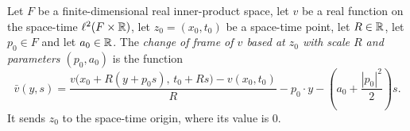 \begin{definition}
Let $F$ be a finite-dimensional real inner-product space, let $v$ be a real
function on the space-time $\ell^2(F\times\mathbb{R})$, let $z_0=(x_0,t_0)$ be a
space-time point, let $R\in\mathbb{R}$, let $p_0\in F$ and let $a_0\in\mathbb{R}$. The
\emph{change of frame of $v$ based at $z_0$ with scale $R$ and parameters
$(p_0,a_0)$} is the function
\[
  \bar v(y,s)=
  \frac{v\bigl(x_0+R(y+p_0s),\,t_0+Rs\bigr)-v(x_0,t_0)}{R}
       -p_0\cdot y-\left(a_0+\frac{|p_0|^2}{2}\right)s .
\]
It sends $z_0$ to the space-time origin, where its value is $0$.
\end{definition}
